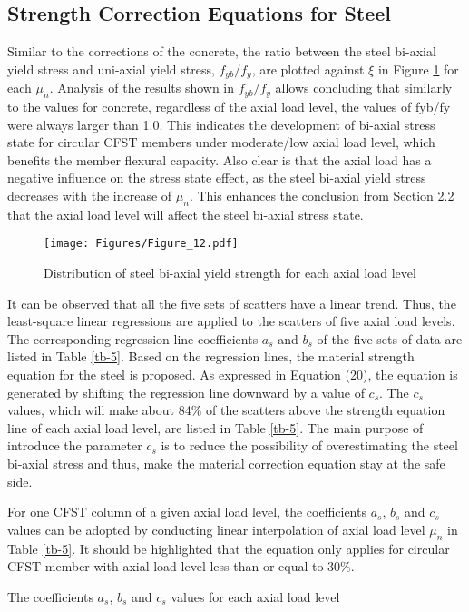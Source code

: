 \documentclass[12pt,a4]{article}
\begin{document}
	\subsection{Strength Correction Equations for Steel}
	Similar to the corrections of the concrete, the ratio between the steel bi-axial yield stress and uni-axial yield stress, $f_{yb}/f_y$, are plotted against $ξ$ in Figure \ref{fig-11} for each $μ_n$. Analysis of the results shown in $f_{yb}/f_y$ allows concluding that similarly to the values for concrete, regardless of the axial load level, the values of fyb/fy were always larger than 1.0. This indicates the development of bi-axial stress state for circular CFST members under moderate/low axial load level, which benefits the member flexural capacity. Also clear is that the axial load has a negative influence on the stress state effect, as the steel bi-axial yield stress decreases with the increase of $μ_n$. This enhances the conclusion from Section 2.2 that the axial load level will affect the steel bi-axial stress state.
	\par
	\begin{figure}[h]
		\centering
		\texttt{[image: Figures/Figure\_12.pdf]}
		\caption{Distribution of steel bi-axial yield strength for each axial load level}
		\label{fig-11}
	\end{figure}
	\par
	It can be observed that all the five sets of scatters have a linear trend. Thus, the least-square linear regressions are applied to the scatters of five axial load levels. The corresponding regression line coefficients $a_s$ and $b_s$ of the five sets of data are listed in Table \ref{tb-5}. Based on the regression lines, the material strength equation for the steel is proposed. As expressed in Equation (20), the equation is generated by shifting the regression line downward by a value of $c_s$. The $c_s$ values, which will make about 84\% of the scatters above the strength equation line of each axial load level, are listed in Table \ref{tb-5}. The main purpose of introduce the parameter $c_s$ is to reduce the possibility of overestimating the steel bi-axial stress and thus, make the material correction equation stay at the safe side.
	\par
	For one CFST column of a given axial load level, the coefficients $a_s$, $b_s$ and $c_s$ values can be adopted by conducting linear interpolation of axial load level $μ_n$ in Table \ref{tb-5}. It should be highlighted that the equation only applies for circular CFST member with axial load level less than or equal to 30\%.
	\par
	\begin{table}
		\caption{The coefficients $a_s$, $b_s$ and $c_s$ values for each axial load level}
		\label{tb-5}
	\end{table}
	\par
\end{document}
